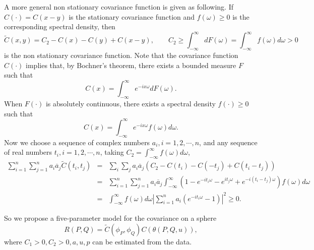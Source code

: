 \begin{enumerate}
		      \begin{prop}
		      	A more general non stationary covariance function is given as following. If $C(\cdot) = C(x-y)$ is the stationary covariance function and $f(\omega) \ge 0$ is the corresponding spectral density, then
		      	\[
		      		\tilde{C}(x, y) = C_2 - C(x) - C(y) + C(x-y), \quad \quad C_2 \ge \int_{-\infty}^\infty dF(\omega) = \int_{-\infty}^\infty f(\omega)d\omega > 0
		      	\]
		      	is the non stationary covariance function. Note that the covariance function $C(\cdot)$ implies that, by Bochner's theorem, there exists a bounded measure $F$ such that
		      	\[
		      		C(x) = \int_{-\infty}^\infty e^{-ix\omega}dF(\omega).
		      	\]
		      	When $F(\cdot)$ is absolutely continuous, there exists a spectral density $f(\cdot) \ge 0$ such that
		      	\[
		      		C(x) = \int_{-\infty}^\infty e^{-ix\omega}f(\omega)d\omega.
		      	\]
		      	Now we choose a sequence of complex numbers $a_i, i = 1, 2, \cdots, n$, and any sequence of real numbers $t_i, i = 1, 2, \cdots, n$, taking $C_2 = \int_{-\infty}^\infty f(\omega)d\omega$,
		      	\begin{eqnarray*}
		      		\sum_{i=1}^n \sum_{j=1}^n a_i \overline{a}_j \tilde{C}(t_i, t_j) &=& \sum_i \sum_j a_i \overline{a}_j (C_2 - C(t_i) - C(-t_j) + C(t_i-t_j)) \\
		      		&=& \sum_{i=1}^n \sum_{j=1}^n a_i \overline{a}_j \int_{-\infty}^\infty(1-  e^{-it_i\omega} - e^{it_j\omega} + e^{-i(t_i-t_j)\omega})f(\omega)d\omega \\
		      		&=&\int_{-\infty}^\infty f(\omega)d\omega \left|\sum_{i=1}^n a_i(e^{-it_i\omega} - 1)\right|^2 \ge 0.
		      	\end{eqnarray*}
		      \end{prop}
		      
		      
	\end{enumerate}
	So we propose a five-parameter model for the covariance on a sphere
	\[
		R(P,Q) = \tilde{C}(\phi_P, \phi_Q) C(\theta(P,Q,u)),
	\]
	where $C_1 > 0, C_2 > 0, a, u, p$ can be estimated from the data.
	
	
